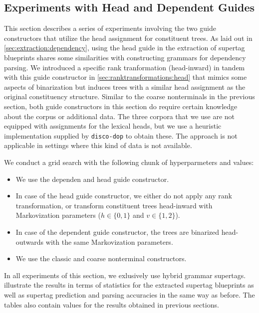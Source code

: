\documentclass[../../document.tex]{subfiles}
\begin{document}
    \subsection{Experiments with Head and Dependent Guides}
    This section describes a series of experiments involving the two guide constructors that utilize the head assignment for constituent trees.
    As laid out in \cref{sec:extraction:dependency}, using the head guide in the extraction of supertag blueprints shares some similarities with constructing grammars for dependency parsing.
    We introduced a specific rank tranformation (head-inward) in tandem with this guide constructor in \cref{sec:ranktransformations:head} that mimics some aspects of binarization but induces trees with a similar head assignment as the original constituency structure.
    Similar to the coarse nonterminals in the previous section, both guide constructors in this section do require certain knowledge about the corpus or additional data.
    The three corpora that we use are not equipped with assignments for the lexical heads, but we use a heuristic implementation supplied by \texttt{disco-dop} to obtain these.
    The approach is not applicable in settings where this kind of data is not available.

    We conduct a grid search with the following chunk of hyperparmeters and values:
    \begin{itemize}
        \item We use the dependen and head guide constructor.
        \item In case of the head guide constructor, we either do not apply any rank transformation, or transform constituent trees head-inward with Markovization parameters ($h \in \{0,1\}$ and $v \in \{1,2\}$).
        \item In case of the dependent guide constructor, the trees are binarized head-outwards with the same Markovization parameters.
        \item We use the classic and coarse nonterminal constructors.
    \end{itemize}
    In all experiments of this section, we exlusively use hybrid grammar supertags.
     illustrate the results in terms of statistics for the extracted supertag blueprints as well as supertag prediction and parsing accuracies in the same way as before.
    The tables also contain values for the results obtained in previous sections.
\end{document}
